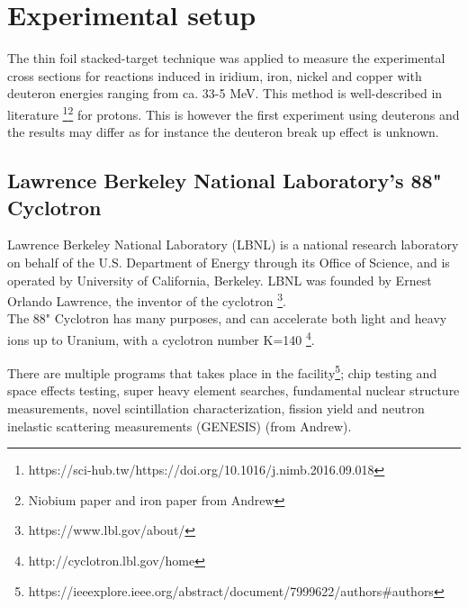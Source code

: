 \chapter{Experimental setup}

The thin foil stacked-target technique was applied to measure the experimental cross sections for reactions induced in iridium, iron, nickel and copper with deuteron energies ranging from ca. 33-5 MeV. This method is well-described in literature \footnote{https://sci-hub.tw/https://doi.org/10.1016/j.nimb.2016.09.018}\footnote{Niobium paper and iron paper from Andrew} for protons. This is however the first experiment using deuterons and the results may differ as for instance the deuteron break up effect is unknown. 

\section{Lawrence Berkeley National Laboratory's 88" Cyclotron}

Lawrence Berkeley National Laboratory (LBNL) is a national research laboratory on behalf of the U.S. Department of Energy through its Office of Science, and is operated by University of California, Berkeley. LBNL was founded by Ernest Orlando Lawrence, the inventor of the cyclotron \footnote{https://www.lbl.gov/about/}. \\ 


\noindent
The 88" Cyclotron has many purposes, and can accelerate both light and heavy ions up to Uranium, with a cyclotron number K=140  \footnote{http://cyclotron.lbl.gov/home}. %

\noindent 
There are multiple programs that takes place in the facility\footnote{https://ieeexplore.ieee.org/abstract/document/7999622/authors#authors}; chip testing and space effects testing, super heavy element searches, fundamental nuclear structure measurements, novel scintillation characterization, fission yield and neutron inelastic scattering measurements (GENESIS) (from Andrew). \\


